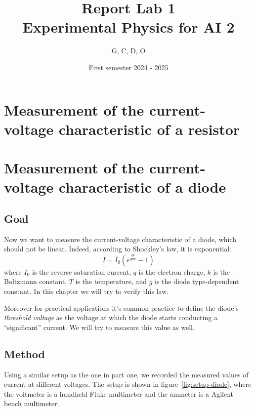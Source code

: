 

\title{Report Lab 1\\\small Experimental Physics for AI 2}
\author{G, C, D, O}
\date{First semester 2024 \-- 2025}



\maketitle

\chapter{Measurement of the current-voltage characteristic of a resistor}
\chapter{Measurement of the current-voltage characteristic of a diode}
\section{Goal}
Now we want to measure the current-voltage characteristic of a diode, which
should not be linear. Indeed, according to Shockley's law, it is exponential:
\[
    I = I_0 \left( e^{\frac{qV}{gkT}} - 1 \right)
\]
where $I_0$ is the reverse saturation current, $q$ is the electron charge, \(k\)
is the Boltzmann constant, \(T\) is the temperature, and \(g\) is the diode
type-dependent constant. In this chapter we will try to verify this law.

Moreover for practical applications it's common practice to define the diode's
\emph{threshold voltage} as the voltage at which the diode starts conducting a
``significant'' current. We will try to measure this value as well.

\section{Method}
Using a similar setup as the one in part one, we recorded the measured values of
current at different voltages. The setup is shown in
figure~\ref{fig:setup-diode}, where the voltmeter is a handheld Fluke
multimeter and the ammeter is a Agilent bench multimeter.

